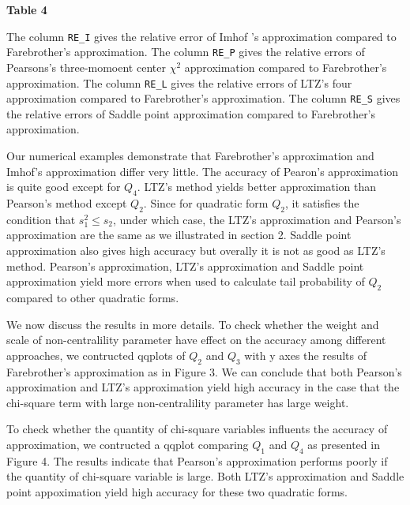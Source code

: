 \documentclass[paper=a4]{article}
\numberwithin{equation}{section}
\begin{document}
\begin{center}
\end{center}

\clearpage
\begin{small}
	\setlength{\parindent}{0cm}
\textbf{Table 4}

The column \texttt{RE\_I} gives the relative error of Imhof 's approximation compared to Farebrother's approximation. The column \texttt{RE\_P} gives the relative errors of Pearsons's three-momoent center $\chi^2$ approximation compared to Farebrother's approximation. The column \texttt{RE\_L} gives the relative errors of LTZ's four approximation compared to Farebrother's approximation. The column \texttt{RE\_S} gives the relative errors of Saddle point approximation compared to Farebrother's approximation. 
\end{small}

\begin{center}
\end{center}

Our numerical examples demonstrate that Farebrother's approximation and Imhof's approximation differ very little. The accuracy of Pearon's approximation is quite good except for $Q_4$. LTZ's method yields better approximation than Pearson's method except $Q_2$. Since for quadratic form $Q_2$, it satisfies the condition that $s_1^2\leq s_2$, under which case, the LTZ's approximation and Pearson's approximation are the same as we illustrated in section 2. Saddle point approximation also gives high accuracy but overally it is not as good as LTZ's method. Pearson's approximation, LTZ's approximation and Saddle point approximation yield more errors when used to calculate tail probability of $Q_2$ compared to other quadratic forms.

We now discuss the results in more details. To check whether the weight and scale of non-centralility parameter have effect on the accuracy among different approaches, we contructed qqplots of $Q_2$ and $Q_3$ with y axes the results of Farebrother's approximation as in Figure 3. We can conclude that both Pearson's approximation and LTZ's approximation yield high accuracy in the case that the chi-square term with large non-centralility parameter has large weight.

To check whether the quantity of chi-square variables influents the accuracy of approximation, we contructed a qqplot comparing $Q_1$ and $Q_4$ as presented in Figure 4. The results indicate that Pearson's approximation performs poorly if the quantity of chi-square variable is large. Both LTZ's approximation and Saddle point appoximation yield high accuracy for these two quadratic forms.
\end{document}
